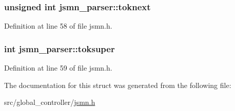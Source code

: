 \hypertarget{structjsmn__parser_af640efd7d154218124a964b65f114bff}{
\subsubsection[{toknext}]{\setlength{\rightskip}{0pt plus 5cm}unsigned int jsmn\-\_\-parser\-::toknext}}\label{structjsmn__parser_af640efd7d154218124a964b65f114bff}


Definition at line 58 of file jsmn.\-h.

\hypertarget{structjsmn__parser_af11fcec48d9f1298909777a12f1d1e39}{
\subsubsection[{toksuper}]{\setlength{\rightskip}{0pt plus 5cm}int jsmn\-\_\-parser\-::toksuper}}\label{structjsmn__parser_af11fcec48d9f1298909777a12f1d1e39}


Definition at line 59 of file jsmn.\-h.



The documentation for this struct was generated from the following file\-:\begin{DoxyCompactItemize}
\item 
src/global\-\_\-controller/\hyperlink{global__controller_2jsmn_8h}{jsmn.\-h}\end{DoxyCompactItemize}
